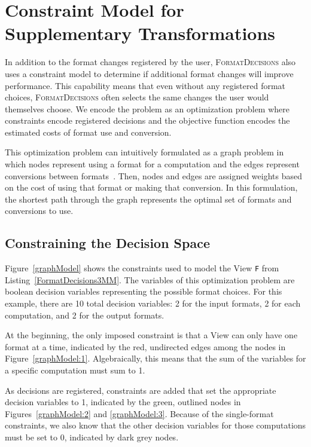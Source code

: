 \documentclass[sigconf,review=true]{acmart}
\newcommand{\FormatDecisions}[0]{{\textsc{FormatDecisions}}}
\begin{document}
\section{Constraint Model for Supplementary Transformations}

In addition to the format changes registered by the user, \FormatDecisions{} also uses a constraint model to determine if additional format changes will improve performance. 
This capability means that even without any registered format choices, \FormatDecisions{} often selects the same changes the user would themselves choose.
We encode the problem as an optimization problem where constraints encode registered decisions and the objective function encodes the estimated costs of format use and conversion.

This optimization problem can intuitively formulated as a graph problem in which nodes represent using a format for a computation and the edges represent conversions between formats~\cite{kennedy1998automatic}.
Then, nodes and edges are assigned weights based on the cost of using that format or making that conversion. 
In this formulation, the shortest path through the graph represents the optimal set of formats and conversions to use.

\subsection{Constraining the Decision Space}
Figure~\ref{graphModel} shows the constraints used to model the View \verb.F. from Listing~\ref{FormatDecisions3MM}.
The variables of this optimization problem are boolean decision variables representing the possible format choices. 
For this example, there are 10 total decision variables: 2 for the input formats, 2 for each computation, and 2 for the output formats.

At the beginning, the only imposed constraint is that a View can only have one format at a time, indicated by the red, undirected edges among the nodes in Figure~\ref{graphModel:1}.
Algebraically, this means that the sum of the variables for a specific computation must sum to 1. 

As decisions are registered, constraints are added that set the appropriate decision variables to 1, indicated by the green, outlined nodes in Figures~\ref{graphModel:2} and \ref{graphModel:3}. 
Because of the single-format constraints, we also know that the other decision variables for those computations must be set to 0, indicated by dark grey nodes.
\end{document}

